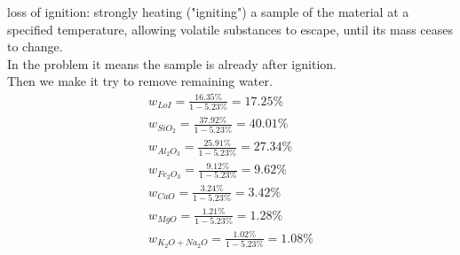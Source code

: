 \documentclass{article}
\begin{document}
loss of ignition: strongly heating ("igniting") a sample of the material at a specified temperature, allowing volatile substances to escape, until its mass ceases to change.\\
In the problem it means the sample is already after ignition.\\
Then we make it try to remove remaining water.\\
\begin{equation}
    \begin{multlined}
        w_{LoI} = \frac{16.35\%}{1 - 5.23\%} = 17.25\%\\
        w_{SiO_2} = \frac{37.92\%}{1 - 5.23\%} = 40.01\%\\
        w_{Al_2O_3} = \frac{25.91\%}{1 - 5.23\%} = 27.34\%\\
        w_{Fe_2O_3} = \frac{9.12\%}{1 - 5.23\%} = 9.62\%\\
        w_{CaO} = \frac{3.24\%}{1 - 5.23\%} = 3.42\%\\
        w_{MgO} = \frac{1.21\%}{1 - 5.23\%} = 1.28\%\\
        w_{K_2O+Na_2O} = \frac{1.02\%}{1 - 5.23\%} = 1.08\%
    \end{multlined}
\end{equation}
\end{document}
